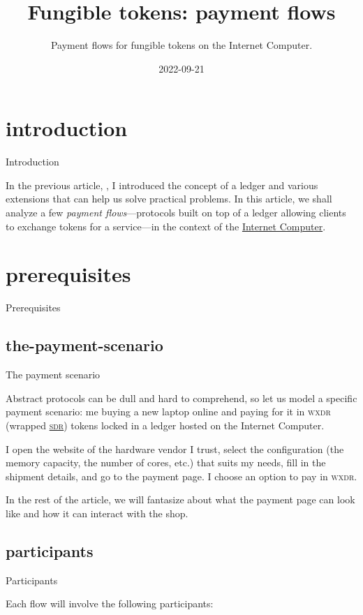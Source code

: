 \documentclass{article}
\title{Fungible tokens: payment flows}
\subtitle{Payment flows for fungible tokens on the Internet Computer.}
\date{2022-09-21}
\begin{document}
\section{introduction}{Introduction}

In the previous article, , I introduced the concept of a ledger and various extensions that can help us solve practical problems.
In this article, we shall analyze a few \emph{payment flows}---protocols built on top of a ledger allowing clients to exchange tokens for a service---in the context of the \href{https://internetcomputer.org}{Internet Computer}.

\section{prerequisites}{Prerequisites}
\subsection{the-payment-scenario}{The payment scenario}

Abstract protocols can be dull and hard to comprehend, so let us model a specific payment scenario: me buying a new laptop online and paying for it in \textsc{wxdr} (wrapped \href{https://en.wikipedia.org/wiki/Special_drawing_rights}{\textsc{sdr}}) tokens locked in a ledger hosted on the Internet Computer.

I open the website of the hardware vendor I trust, select the configuration (the memory capacity, the number of cores, etc.) that suits my needs, fill in the shipment details, and go to the payment page.
I choose an option to pay in \textsc{wxdr}.

In the rest of the article, we will fantasize about what the payment page can look like and how it can interact with the shop.

\subsection{participants}{Participants}

Each flow will involve the following participants:
\end{document}
